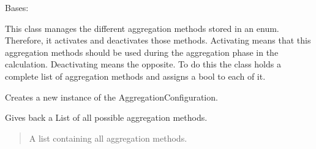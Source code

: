 \documentclass[letterpaper,10pt,english]{sphinxmanual}
\begin{document}
\begin{fulllineitems}
\label{\detokenize{apidoc/src.osm_configurator.model.project.configuration:src.osm_configurator.model.project.configuration.aggregation_configuration.AggregationConfiguration}}
\pysigstartsignatures
{}
\pysigstopsignatures
\sphinxAtStartPar
Bases: 

\sphinxAtStartPar
This class manages the different aggregation methods stored in an enum. Therefore, it activates and deactivates
those methods. Activating means that this aggregation methods should be used during the aggregation phase in the
calculation. Deactivating means the opposite.
To do this the class holds a complete list of aggregation methods and assigns a bool to each of it.

\begin{fulllineitems}
\label{\detokenize{apidoc/src.osm_configurator.model.project.configuration:src.osm_configurator.model.project.configuration.aggregation_configuration.AggregationConfiguration.__init__}}
\pysigstartsignatures
{}
\pysigstopsignatures
\sphinxAtStartPar
Creates a new instance of the AggregationConfiguration.

\end{fulllineitems}


\begin{fulllineitems}
\label{\detokenize{apidoc/src.osm_configurator.model.project.configuration:src.osm_configurator.model.project.configuration.aggregation_configuration.AggregationConfiguration.get_all_aggregation_methods}}
\pysigstartsignatures
{}
\pysigstopsignatures
\sphinxAtStartPar
Gives back a List of all possible aggregation methods.
\begin{quote}\begin{description}
\sphinxAtStartPar
A list containing all aggregation methods.


\end{description}
\end{quote}
\end{fulllineitems}
\end{fulllineitems}
\end{document}

